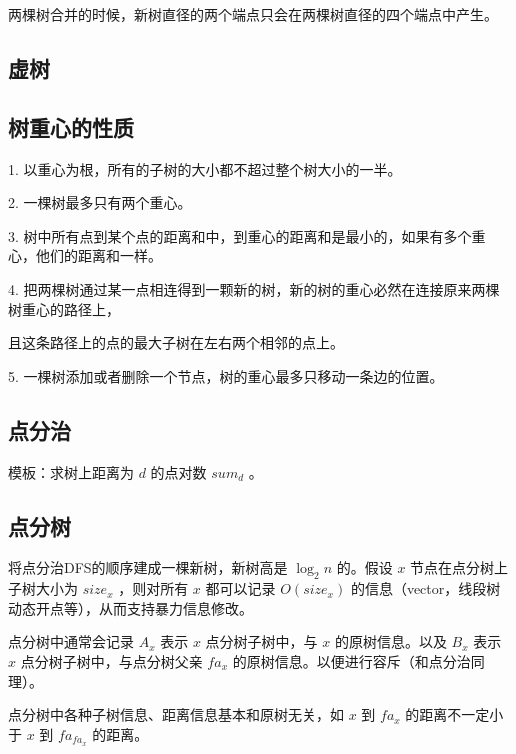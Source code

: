 两棵树合并的时候，新树直径的两个端点只会在两棵树直径的四个端点中产生。

\subsection{虚树}



\subsection{树重心的性质}

1. 以重心为根，所有的子树的大小都不超过整个树大小的一半。

2. 一棵树最多只有两个重心。

3. 树中所有点到某个点的距离和中，到重心的距离和是最小的，如果有多个重心，他们的距离和一样。

4. 把两棵树通过某一点相连得到一颗新的树，新的树的重心必然在连接原来两棵树重心的路径上，

\hspace{0.3cm} 且这条路径上的点的最大子树在左右两个相邻的点上。

5. 一棵树添加或者删除一个节点，树的重心最多只移动一条边的位置。

\subsection{点分治}

模板：求树上距离为 $d$ 的点对数 $sum_d$ 。



\subsection{点分树}

将点分治DFS的顺序建成一棵新树，新树高是 $\log_2n$ 的。假设 $x$ 节点在点分树上子树大小为 $size_x$ ，则对所有 $x$ 都可以记录 $O(size_x)$ 的信息（vector，线段树动态开点等），从而支持暴力信息修改。

\vspace{0.1cm}

点分树中通常会记录 $A_x$ 表示 $x$ 点分树子树中，与 $x$ 的原树信息。以及 $B_x$ 表示 $x$ 点分树子树中，与点分树父亲 $fa_x$ 的原树信息。以便进行容斥（和点分治同理）。


\vspace{0.1cm}

点分树中各种子树信息、距离信息基本和原树无关，如 $x$ 到 $fa_x$ 的距离不一定小于 $x$ 到 $fa_{fa_x}$ 的距离。

